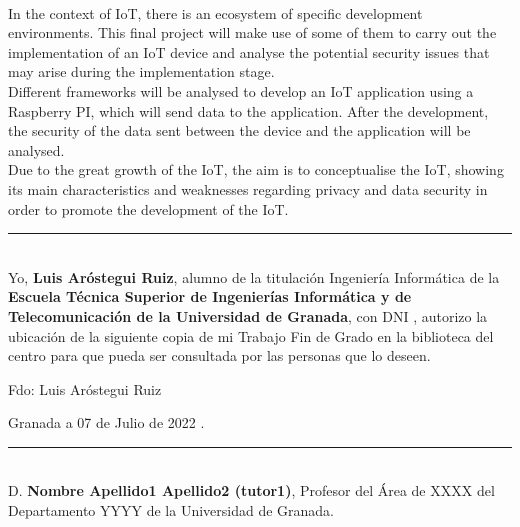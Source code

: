 \vspace{0.7cm}
\\

In the context of IoT, there is an ecosystem of specific development environments. This final project will make use of some of them to carry out the implementation of an IoT device and analyse the potential security issues that may arise during the implementation stage. \\

Different frameworks will be analysed to develop an IoT application using a Raspberry PI, which will send data to the application. After the development, the security of the data sent between the device and the application will be analysed. \\

Due to the great growth of the IoT, the aim is to conceptualise the IoT, showing its main characteristics and weaknesses regarding privacy and data security in order to promote the development of the IoT.

\cleardoublepage
\thispagestyle{empty}

\noindent\rule[-1ex]{\textwidth}{2pt}\\[4.5ex]

Yo, \textbf{Luis Aróstegui Ruiz}, alumno de la titulación Ingeniería Informática de la \textbf{Escuela Técnica Superior
de Ingenierías Informática y de Telecomunicación de la Universidad de Granada}, con DNI , autorizo la
ubicación de la siguiente copia de mi Trabajo Fin de Grado en la biblioteca del centro para que pueda ser
consultada por las personas que lo deseen.

\vspace{6cm}

\noindent Fdo: Luis Aróstegui Ruiz

\vspace{2cm}

\begin{flushright}
Granada a 07 de Julio de 2022 .
\end{flushright}

\cleardoublepage
\thispagestyle{empty}

\noindent\rule[-1ex]{\textwidth}{2pt}\\[4.5ex]

D. \textbf{Nombre Apellido1 Apellido2 (tutor1)}, Profesor del Área de XXXX del Departamento YYYY de la Universidad de Granada.

\vspace{0.5cm}

